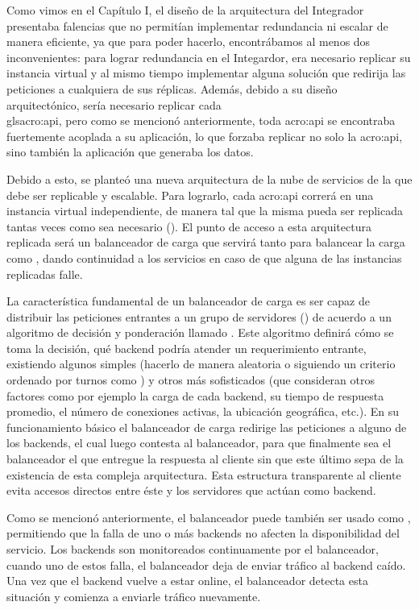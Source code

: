 Como vimos en el Capítulo I, el diseño de la arquitectura del Integrador presentaba falencias que no permitían implementar redundancia ni escalar de manera eficiente, ya que para poder hacerlo, encontrábamos al menos dos inconvenientes: para lograr redundancia en el Integardor, era necesario replicar su instancia virtual y al mismo tiempo implementar alguna solución que redirija las peticiones a cualquiera de sus réplicas.  Además, debido a su diseño arquitectónico, sería necesario replicar cada \\gls{acro:api}, pero como se mencionó anteriormente, toda \gls{acro:api} se encontraba fuertemente acoplada a su aplicación, lo que forzaba replicar no solo la \gls{acro:api}, sino también la aplicación que generaba los datos.

Debido a esto, se planteó una nueva arquitectura de la nube de servicios de la {\unlp} que debe ser replicable y escalable. Para lograrlo, cada \gls{acro:api} correrá en una instancia virtual independiente, de manera tal que la misma pueda ser replicada tantas veces como sea necesario (). El punto de acceso a esta arquitectura replicada será un balanceador de carga que servirá tanto para balancear la carga como , dando continuidad a los servicios en caso de que alguna de las instancias replicadas falle.

La característica fundamental de un balanceador de carga es ser capaz de distribuir las peticiones entrantes a un grupo de servidores () de acuerdo a un algoritmo de decisión y ponderación llamado . Este algoritmo definirá cómo se toma la decisión, qué backend podría atender un requerimiento entrante, existiendo algunos simples (hacerlo de manera aleatoria o siguiendo un criterio ordenado por turnos como ) y otros más sofisticados (que consideran otros factores como por ejemplo la carga de cada backend, su tiempo de respuesta promedio, el número de conexiones activas, la ubicación geográfica, etc.). En su funcionamiento básico el balanceador de carga redirige las peticiones a alguno de los backends, el cual luego contesta al balanceador, para que finalmente sea el balanceador el que entregue la respuesta al cliente sin que este último sepa de la existencia de esta compleja arquitectura. Esta estructura transparente al cliente evita accesos directos entre éste y los servidores que actúan como backend.

Como se mencionó anteriormente, el balanceador puede también ser usado como , permitiendo que la falla de uno o más backends no afecten la disponibilidad del servicio. Los backends son monitoreados continuamente por el balanceador, cuando uno de estos falla, el balanceador deja de enviar tráfico al backend caído. Una vez que el backend vuelve a estar online, el balanceador detecta esta situación y comienza a enviarle tráfico nuevamente.


